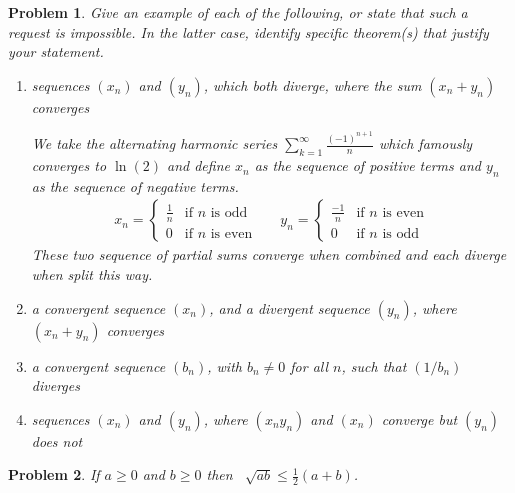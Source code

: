 \documentclass[12pt]{article}
\newtheorem{problem}{Problem}
\begin{document}
\begin{problem} %
Give an example of each of the following, or state that such a request is impossible.  In the latter case, identify specific theorem(s) that justify your statement.

\renewcommand{\labelenumi}{(\alph{enumi})}
\begin{enumerate}
\item sequences $(x_n)$ and $(y_n)$, which both diverge, where the sum $(x_n+y_n)$ converges

	We take the alternating harmonic series $\sum_{k=1}^\infty \frac{(-1)^{n+1}}{n}$ which famously converges to $\ln(2)$ and define $x_n$ as the sequence of positive terms and $y_n$ as the sequence of negative terms.
	\begin{align*}
		x_n = 
	\begin{cases}
		\frac{1}{n} &\text{if } n \text{ is odd} \\
		0 & \text{if } n \text{ is even}
	\end{cases} && y_n =
	\begin{cases}
		\frac{-1}{n} &\text{if } n \text{ is even} \\
		0 & \text{if } n \text{ is odd}
	\end{cases}
\end{align*}
These two sequence of partial sums converge when combined and each diverge when split this way.
\item a convergent sequence $(x_n)$, and a divergent sequence $(y_n)$, where $(x_n+y_n)$ converges


\item a convergent sequence $(b_n)$, with $b_n\ne 0$ for all $n$, such that $(1/b_n)$ diverges


\item sequences $(x_n)$ and $(y_n)$, where $(x_n y_n)$ and $(x_n)$ converge but $(y_n)$ does not


\end{enumerate}
\end{problem}


\begin{problem} %
If $a\ge 0$ and $b\ge 0$ then \, $\displaystyle \sqrt{ab} \le \frac{1}{2}\left(a+b\right)$.
\end{problem}

\end{document}
